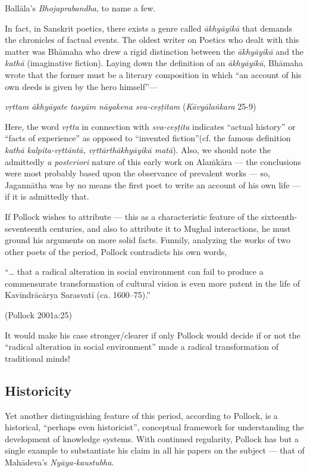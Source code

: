 Ballāla’s {\sl Bhojaprabandha},  to name a few. 

In fact, in Sanskrit poetics, there exists a genre called {\sl ākhyāyikā} that demands the chronicles of factual events. The oldest writer on Poetics who dealt with this matter was Bhāmaha who drew a rigid distinction between the {\sl ākhyāyikā} and the {\sl kathā} (imaginative fiction). Laying down the definition of an {\sl ākhyāyikā}, Bhāmaha wrote that the former must be a literary composition in which “an account of his own deeds is given by the hero himself”— 

{\sl vṛttam ākhyāyate tasyām nāyakena sva-ceṣṭitam} 	          \hfill{({\sl Kāvyālaṅkara} 25-9)}

Here, the word {\sl vṛtta} in connection with {\sl sva-ceṣṭita} indicates “actual history” or “facts of experience” as opposed to “invented fiction”(cf. the famous definition {\sl kathā kalpita-vṛttāntā, vṛttārthākhyāyikā matā}). Also, we should note the admittedly {\sl a posteriori} nature of this early work on Alaṁkāra — the conclusions were most probably based upon the observance of prevalent works — so, Jagannātha was by no means the first poet to write an account of his own life — if it is admittedly that.  

If Pollock wishes to attribute — this as a characteristic feature of the sixteenth-seventeenth centuries, and also to attribute it to Mughal interactions, he must ground his arguments on more solid facts. Funnily, analyzing the works of two other poets of the period, Pollock contradicts his own words,

 “… that a radical alteration in social environment can fail to produce a commensurate transformation of cultural vision is even more patent in the life of Kavīndrācārya Sarasvatī (ca. 1600–75).” 

\hfill (Pollock 2001a:25)

It would make his case stronger/clearer if only Pollock would decide if or not the “radical alteration in social environment” made a radical transformation of traditional minds!\\[-20pt] 

\subsection{Historicity}%

Yet another distinguishing feature of this period, according to Pollock, is a historical, “perhaps even historicist”, conceptual framework for understanding the development of knowledge systems. With continued regularity, Pollock has but a single example to substantiate his claim in all his papers on the subject — that of Mahādeva’s {\sl Nyāya-kaustubha}. 

